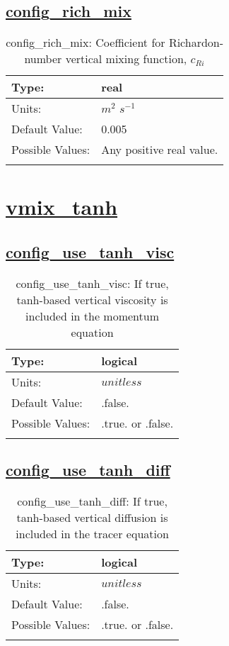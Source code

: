 \subsection[config\_rich\_mix]{\hyperref[sec:nm_tab_vmix_rich]{config\_rich\_mix}}
\label{subsec:nm_sec_config_rich_mix}
\begin{center}
\begin{longtable}{| p{2.0in} | p{4.0in} |}
    \hline
    Type: & real \\
    \hline
    Units: & $m^2$ $s^{-1}$ \\
    \hline
    Default Value: & 0.005 \\
    \hline
    Possible Values: & Any positive real value. \\
    \hline
    \caption{config\_rich\_mix:  Coefficient for Richardon-number vertical mixing function,  $c_{Ri}$ }
\end{longtable}
\end{center}
\section[vmix\_tanh]{\hyperref[sec:nm_tab_vmix_tanh]{vmix\_tanh}}
\label{sec:nm_sec_vmix_tanh}
\subsection[config\_use\_tanh\_visc]{\hyperref[sec:nm_tab_vmix_tanh]{config\_use\_tanh\_visc}}
\label{subsec:nm_sec_config_use_tanh_visc}
\begin{center}
\begin{longtable}{| p{2.0in} | p{4.0in} |}
    \hline
    Type: & logical \\
    \hline
    Units: & $unitless$ \\
    \hline
    Default Value: & .false. \\
    \hline
    Possible Values: & .true. or .false. \\
    \hline
    \caption{config\_use\_tanh\_visc: If true, tanh-based vertical viscosity is included in the momentum equation}
\end{longtable}
\end{center}
\subsection[config\_use\_tanh\_diff]{\hyperref[sec:nm_tab_vmix_tanh]{config\_use\_tanh\_diff}}
\label{subsec:nm_sec_config_use_tanh_diff}
\begin{center}
\begin{longtable}{| p{2.0in} | p{4.0in} |}
    \hline
    Type: & logical \\
    \hline
    Units: & $unitless$ \\
    \hline
    Default Value: & .false. \\
    \hline
    Possible Values: & .true. or .false. \\
    \hline
    \caption{config\_use\_tanh\_diff: If true, tanh-based vertical diffusion is included in the tracer equation}
\end{longtable}
\end{center}
